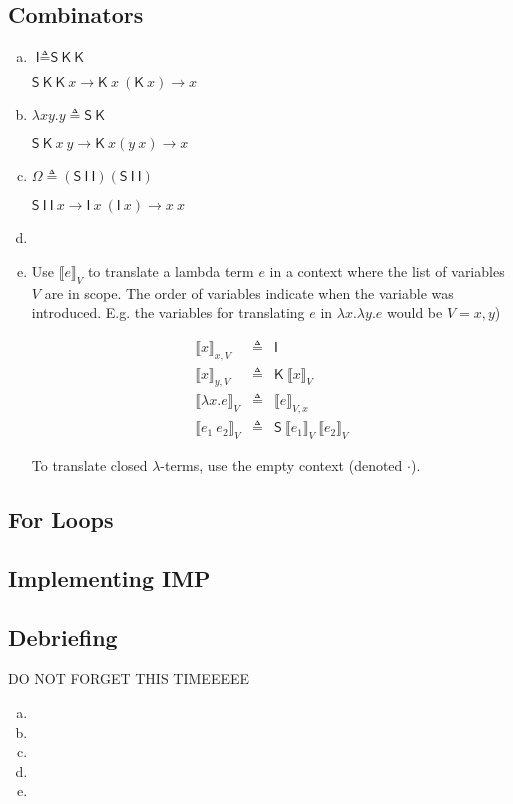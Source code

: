 \documentclass[10pt]{article}
\newcommand{\problem}[1]{\subsection*{\sf #1}}
\newcommand{\translate}[2]{\ensuremath {\llbracket #1 \rrbracket}_{#2}}
\newcommand{\defined}{\triangleq}
\renewcommand{\S}{\textsf{S}}
\newcommand{\K}{\textsf{K}}
\newcommand{\I}{\textsf{I}}
\begin{document}
\problem{3 Combinators} %
\begin{enumerate}[(a)]
  \item $\I \defined \S~\K~\K$
  
  $\S~\K~\K~x \rightarrow \K~x~(\K~x) \rightarrow x$
  \item $ \lambda x y.y \defined \S~\K$
  
  $\S~\K~x~y \rightarrow \K~x(y~x) \rightarrow x$
  \item $\Omega \defined (\S~ \I~ \I) (\S~ \I~ \I)$
  
  $\S~ \I~ \I~x \rightarrow \I ~ x ~ (\I ~ x) \rightarrow x~x$
  \item
  \item


  Use $\translate{e}{V}$ to translate a lambda term $e$ in a context
  where the list of variables $V$ are in scope. The order of variables indicate
  when the variable was introduced. E.g. the variables for translating $e$ in
  $\lambda x. \lambda y. e$ would be $V = x, y$)

  \begin{eqnarray*}
    \translate{x}{x, V}         & \defined & \I                  \\
    \translate{x}{y, V}         & \defined & \K~\translate{x}{V} \\
    \translate{\lambda x. e}{V} & \defined & \translate{e}{V,x}  \\
    \translate{e_1~e_2}{V}      & \defined & \S~\translate{e_1}{V}~\translate{e_2}{V}
  \end{eqnarray*}

  To translate closed $\lambda$-terms, use the empty context (denoted $\cdot$).

\end{enumerate}
\problem{4 For Loops} %
\problem{5 Implementing IMP} %
\problem{6 Debriefing} %
DO NOT FORGET THIS TIMEEEEE

\begin{enumerate}[(a)]
  \item
  \item
  \item
  \item
  \item
\end{enumerate}
\end{document}
